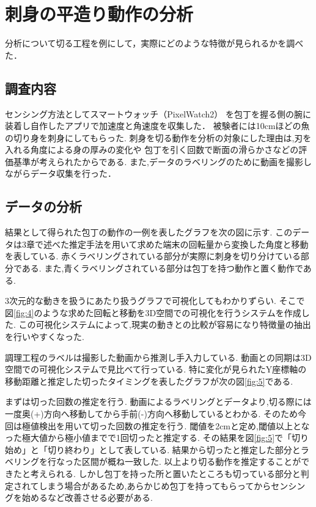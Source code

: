 \section{刺身の平造り動作の分析}
分析について切る工程を例にして，実際にどのような特徴が見られるかを調べた．
\subsection{調査内容}
センシング方法としてスマートウォッチ（PixelWatch2）
を包丁を握る側の腕に装着し自作したアプリで加速度と角速度を収集した．
被験者には10cmほどの魚の切り身を刺身にしてもらった.
刺身を切る動作を分析の対象にした理由は,刃を入れる角度による身の厚みの変化や
包丁を引く回数で断面の滑らかさなどの評価基準が考えられたからである.
また,データのラベリングのために動画を撮影しながらデータ収集を行った．
\subsection{データの分析}

結果として得られた包丁の動作の一例を表したグラフを次の図に示す.
このデータは3章で述べた推定手法を用いて求めた端末の回転量から変換した角度と移動を表している.
赤くラベリングされている部分が実際に刺身を切り分けている部分である.
また,青くラベリングされている部分は包丁を持つ動作と置く動作である.

3次元的な動きを扱うにあたり扱うグラフで可視化してもわかりずらい.
そこで図\ref{fig:4}のような求めた回転と移動を3D空間での可視化を行うシステムを作成した.
この可視化システムによって,現実の動きとの比較が容易になり特徴量の抽出を行いやすくなった.

調理工程のラベルは撮影した動画から推測し手入力している.
動画との同期は3D空間での可視化システムで見比べて行っている.
特に変化が見られたY座標軸の移動距離と推定した切ったタイミングを表したグラフが次の図\ref{fig:5}である.


まずは切った回数の推定を行う.
動画によるラベリングとデータより,切る際には一度奥(+)方向へ移動してから手前(-)方向へ移動しているとわかる.
そのため今回は極値検出を用いて切った回数の推定を行う.
閾値を2cmと定め,閾値以上となった極大値から極小値までで1回切ったと推定する.
その結果を図\ref{fig:5}で「切り始め」と「切り終わり」として表している.
結果から切ったと推定した部分とラベリングを行なった区間が概ね一致した.
以上より切る動作を推定することができたと考えられる.
しかし包丁を持った所と置いたところも切っている部分と判定されてしまう場合があるため,あらかじめ包丁を持ってもらってからセンシングを始めるなど改善させる必要がある.

